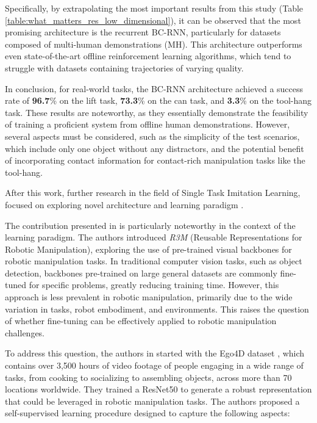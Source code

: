 Specifically, by extrapolating the most important results from this study (Table \ref{table:what_matters_res_low_dimensional}), it can be observed that the most promising architecture is the recurrent BC-RNN, particularly for datasets composed of multi-human demonstrations (MH). This architecture outperforms even state-of-the-art offline reinforcement learning algorithms, which tend to struggle with datasets containing trajectories of varying quality.

In conclusion, for real-world tasks, the BC-RNN architecture achieved a success rate of \textbf{96.7}\% on the lift task, \textbf{73.3}\% on the can task, and \textbf{3.3}\% on the tool-hang task. These results are noteworthy, as they essentially demonstrate the feasibility of training a proficient system from offline human demonstrations. However, several aspects must be considered, such as the simplicity of the test scenarios, which include only one object without any distractors, and the potential benefit of incorporating contact information for contact-rich manipulation tasks like the tool-hang.


After this work, further research in the field of Single Task Imitation Learning, focused on exploring novel architecture \cite{shafiullah2022behavior} and learning paradigm \cite{nair2022r3m,cheng2023diffusion,shi2023waypoint}. 

The contribution presented in \cite{nair2022r3m} is particularly noteworthy in the context of the learning paradigm. The authors introduced \textit{R3M} (Reusable Representations for Robotic Manipulation), exploring the use of pre-trained visual backbones for robotic manipulation tasks. In traditional computer vision tasks, such as object detection, backbones pre-trained on large general datasets are commonly fine-tuned for specific problems, greatly reducing training time. However, this approach is less prevalent in robotic manipulation, primarily due to the wide variation in tasks, robot embodiment, and environments. This raises the question of whether fine-tuning can be effectively applied to robotic manipulation challenges.

To address this question, the authors in \cite{nair2022r3m} started with the Ego4D dataset \cite{grauman2022ego4d}, which contains over 3,500 hours of video footage of people engaging in a wide range of tasks, from cooking to socializing to assembling objects, across more than 70 locations worldwide. They trained a ResNet50 \cite{resnet} to generate a robust representation that could be leveraged in robotic manipulation tasks. The authors proposed a self-supervised learning procedure designed to capture the following aspects:

